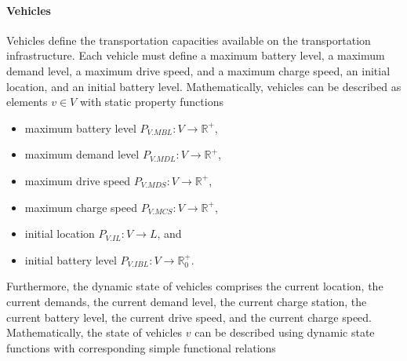 \documentclass{IEEEtran}
\begin{document}
    \paragraph{Vehicles}
    Vehicles define the transportation capacities available on the transportation infrastructure.
    Each vehicle must define a maximum battery level, a maximum demand level, a maximum drive speed, and a maximum charge speed, an initial location, and an initial battery level.
    Mathematically, vehicles can be described as elements $v \in V$ with static property functions
    \begin{itemize}
        \item maximum battery level $P_{V.MBL}: V \rightarrow \mathbb{R}^+$,
        \item maximum demand level $P_{V.MDL}: V \rightarrow \mathbb{R}^+$,
        \item maximum drive speed $P_{V.MDS}: V \rightarrow \mathbb{R}^+$,
        \item maximum charge speed $P_{V.MCS}: V \rightarrow \mathbb{R}^+$,
        \item initial location $P_{V.IL}: V \rightarrow L$, and
        \item initial battery level $P_{V.IBL}: V \rightarrow \mathbb{R}_0^+$.
    \end{itemize}
    Furthermore, the dynamic state of vehicles comprises the current location, the current demands, the current demand level, the current charge station, the current battery level, the current drive speed, and the current charge speed.
    Mathematically, the state of vehicles $v$ can be described using dynamic state functions with corresponding simple functional relations
\end{document}

